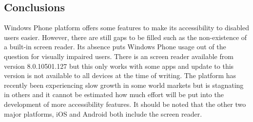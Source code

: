 \subsection{Conclusions}
Windows Phone platform offers some features to make its accessibility to disabled users easier. However, there are still gaps to be filled such as the non-existence of a built-in screen reader. Its absence puts Windows Phone usage out of the question for visually impaired users. There is an screen reader available from version 8.0.10501.127 but this only works with some apps and update to this version is not available to all devices at the time of writing. The platform has recently been experiencing slow growth in some world markets but is stagnating in others \cite{phone8market}  and it cannot be estimated how much effort will be put into the development of more accessibility features. It should be noted that the other two major platforms, iOS and Android both include the screen reader.
\endinput
